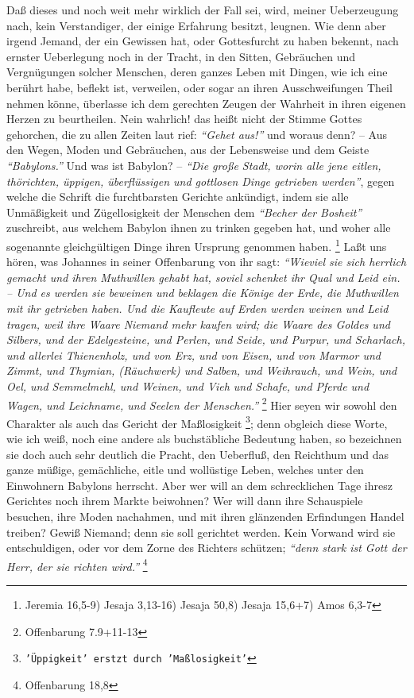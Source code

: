 Daß dieses und noch weit mehr wirklich der Fall sei, wird, meiner Ueberzeugung
nach, kein Verstandiger, der einige Erfahrung besitzt, leugnen. Wie denn aber
irgend Jemand, der ein Gewissen hat, oder Gottesfurcht zu haben bekennt, nach
ernster Ueberlegung noch in der Tracht, in den Sitten, Gebräuchen und
Vergnügungen solcher Menschen, deren ganzes Leben mit Dingen, wie ich eine
berührt habe, beflekt ist, verweilen, oder sogar an ihren Ausschweifungen Theil
nehmen könne, überlasse ich dem gerechten Zeugen der Wahrheit in ihren eigenen
Herzen zu beurtheilen. Nein wahrlich! das heißt nicht der Stimme Gottes
gehorchen,  die zu allen Zeiten laut rief: \textit{"`Gehet aus!"'} und woraus
denn? -- Aus den Wegen, Moden und Gebräuchen, aus der Lebensweise und dem Geiste
\textit{"`Babylons."'} Und was ist Babylon? --
\textit{"`Die große Stadt, worin alle jene eitlen,
thörichten, üppigen, überflüssigen und gottlosen Dinge getrieben werden"'},
gegen
welche die Schrift die furchtbarsten Gerichte ankündigt,
indem sie alle
Unmäßigkeit und Zügellosigkeit der Menschen dem \textit{"`Becher der Bosheit"'}
zuschreibt,
aus welchem Babylon ihnen zu trinken gegeben hat, und woher alle sogenannte
gleichgültigen Dinge ihren Ursprung genommen haben.
\footnote{Jeremia 16,5-9)
Jesaja 3,13-16)
Jesaja 50,8)
Jesaja 15,6+7)
Amos 6,3-7}
Laßt uns hören, was Johannes in
seiner Offenbarung von ihr sagt:
\textit{"`Wieviel sie sich herrlich gemacht und ihren
Muthwillen gehabt hat, soviel schenket ihr Qual und Leid ein. -- Und es werden
sie beweinen und beklagen die Könige der Erde, die Muthwillen mit ihr getrieben
haben. Und die Kaufleute auf Erden werden weinen und Leid tragen, weil ihre
Waare Niemand mehr kaufen wird; die Waare des Goldes und Silbers, und der
Edelgesteine, und Perlen, und Seide, und Purpur, und Scharlach, und allerlei
Thienenholz, und von Erz, und von Eisen, und von Marmor und Zimmt, und Thymian,
(Räuchwerk) und Salben, und Weihrauch, und Wein, und Oel, und Semmelmehl, und
Weinen, und Vieh und Schafe, und Pferde und Wagen, und Leichname, und Seelen der
Menschen."'}
\footnote{Offenbarung 7.9+11-13}
Hier seyen wir sowohl den Charakter
als auch das Gericht der Maßlosigkeit
\footnote{\texttt{'Üppigkeit' erstzt durch 'Maßlosigkeit'}}; denn obgleich diese
Worte, wie ich weiß,
noch eine andere als buchstäbliche Bedeutung
haben, so bezeichnen sie
doch auch
sehr deutlich die Pracht, den Ueberfluß, den Reichthum und das ganze müßige,
gemächliche, eitle und wollüstige Leben, welches unter den Einwohnern
Babylons
herrscht. Aber wer will an dem schrecklichen Tage ihresz
Gerichtes noch ihrem
Markte beiwohnen? Wer will dann ihre Schauspiele besuchen, ihre Moden nachahmen,
und mit ihren glänzenden Erfindungen Handel treiben? Gewiß Niemand; denn sie
soll gerichtet werden. Kein Vorwand wird sie entschuldigen, oder vor dem Zorne
des Richters schützen;
\textit{"`denn stark ist Gott der Herr, der sie richten wird."'}
\footnote{Offenbarung 18,8}


